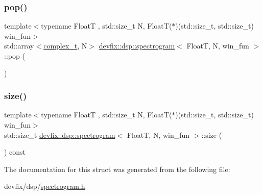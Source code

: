 \subsubsection{\texorpdfstring{pop()}{pop()}}
{\footnotesize\ttfamily template$<$typename FloatT , std\+::size\+\_\+t N, Float\+T($\ast$)(std\+::size\+\_\+t, std\+::size\+\_\+t) win\+\_\+fun$>$ \\
std\+::array$<$\hyperlink{structdevfix_1_1dsp_1_1spectrogram_a920fdda446509cfe81fa287773c709cb}{complex\+\_\+t}, N$>$ \hyperlink{structdevfix_1_1dsp_1_1spectrogram}{devfix\+::dsp\+::spectrogram}$<$ FloatT, N, win\+\_\+fun $>$\+::pop (\begin{DoxyParamCaption}{ }\end{DoxyParamCaption})\hspace{0.3cm}{\ttfamily [inline]}}

\mbox{\label{structdevfix_1_1dsp_1_1spectrogram_a6dc48452751bc4b4f4e14088998ddbb7}} 
\subsubsection{\texorpdfstring{size()}{size()}}
{\footnotesize\ttfamily template$<$typename FloatT , std\+::size\+\_\+t N, Float\+T($\ast$)(std\+::size\+\_\+t, std\+::size\+\_\+t) win\+\_\+fun$>$ \\
std\+::size\+\_\+t \hyperlink{structdevfix_1_1dsp_1_1spectrogram}{devfix\+::dsp\+::spectrogram}$<$ FloatT, N, win\+\_\+fun $>$\+::size (\begin{DoxyParamCaption}{ }\end{DoxyParamCaption}) const\hspace{0.3cm}{\ttfamily [inline]}}



The documentation for this struct was generated from the following file\+:\begin{DoxyCompactItemize}
\item 
devfix/dsp/\hyperlink{spectrogram_8h}{spectrogram.\+h}\end{DoxyCompactItemize}

